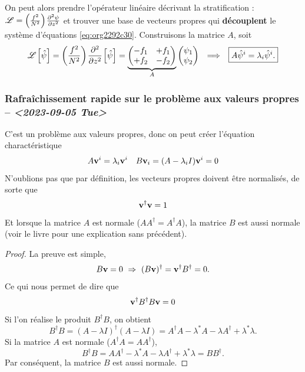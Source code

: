 \documentclass[10pt]{article}
\numberwithin{equation}{section}
\newcommand{\vv}{\vb{v}}
\newcommand{\pt}{\hspace{1pt}} %
\begin{document}
On peut alors prendre l'opérateur linéaire décrivant la stratification : \(\mathscr{L} = \qty(\frac{f^2}{N^2})\pt\pdv[2]{\psi}{z}\) et trouver une base de vecteurs propres qui \textbf{découplent} le système d'équations \ref{eq:org2292c30}.
Construisons la matrice \(A\), soit
\begin{align}
\label{eq:org86d596c}
&& \mathscr{L} \pt\qty[ \hat{\psi} ] = \qty(\frac{f^2}{N^2})\pt\pdv[2]{}{z} \pt\qty[\hat{\psi}]= 
   \underbrace{
   \begin{pmatrix}
     -f_1 & +f_1 \\
     +f_2 & -f_2 \\
   \end{pmatrix}}_{A}
   \begin{pmatrix}
     \psi_1 \\
     \psi_2 \\
   \end{pmatrix}
   && \Longrightarrow
   && \boxed{ A \hat{\psi}^i = \lambda_i \hat{\psi}^i. } &&
\end{align}

\subsubsection{Rafraîchissement rapide sur le problème aux valeurs propres -- \textit{<2023-09-05 Tue>}}
\label{sec:org24bab7e}

C'est un problème aux valeurs propres, donc on peut créer l'équation charactéristique
\begin{align}
\label{eq:org483f3aa}
   && A \vv^i = \lambda_i \vv^i && B \vv_i = (A - \lambda_i I)\vv^i = 0 &&
\end{align}
N'oublions pas que par définition, les vecteurs propres doivent être normalisés, de sorte que
\begin{equation}
   \vv^\dagger \vv = 1
\end{equation}
Et lorsque la matrice \(A\) est normale (\(AA^\dagger = A^\dagger A\)), la matrice \(B\) est aussi normale (voir le livre \textcite[p.274 pour un résumé sans précédent]{riley_hobson_bence_2006} pour une explication sans précédent).
\begin{proof}
La preuve est simple, 
\begin{equation}
   B\vv = 0 \ \Rightarrow\ (B\vv)^\dagger = \vv^\dagger B^\dagger = 0. 
\end{equation}
Ce qui nous permet de dire que
\begin{equation}
   \vv^\dagger B^\dagger B \vv = 0
\end{equation}
Si l'on réalise le produit $B^\dagger B$, on obtient
\begin{equation}
   B^\dagger B = (A-\lambda I)^\dagger (A-\lambda I) = A^\dagger A - \lambda^* A -\lambda A^\dagger + \lambda^*\lambda.
\end{equation}
Si la matrice $A$ est normale ($A^\dagger A = A A^\dagger$),
\begin{equation}
   B^\dagger B = A A^\dagger - \lambda^* A -\lambda A^\dagger + \lambda^*\lambda = BB^\dagger.
\end{equation}
Par conséquent, la matrice $B$ est aussi normale.
\end{proof}
\end{document}
